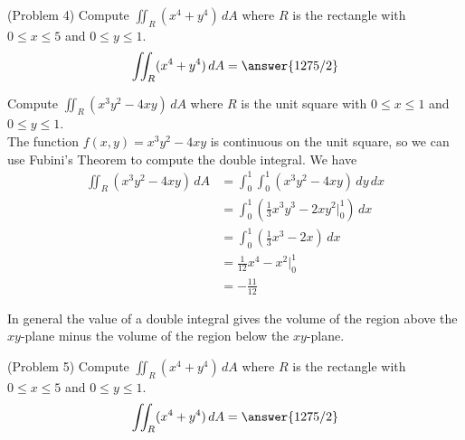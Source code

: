 \documentclass[handout]{ximera}
\begin{document}
\begin{problem}(Problem 4)
Compute $\iint_R (x^4 + y^4) \, dA$ where $R$ is the rectangle with $0 \leq x \leq 5$ and $0 \leq y \leq 1$.\\
\[
\iint_R (x^4 + y^4) \, dA = \answer{1275/2}
\]
\end{problem}

\begin{example}[Example 5]
Compute $\iint_R (x^3y^2 - 4xy) \, dA$ where $R$ is the unit square with $0 \leq x \leq 1$ and $0 \leq y \leq 1$.\\
The function $f(x,y) = x^3y^2 - 4xy$ is continuous on the unit square, so we can use Fubini's Theorem to compute the double integral.
We have
\begin{align*}
\iint_R (x^3y^2 - 4xy) \, dA &= \int_0^1 \int_0^1 (x^3y^2 - 4xy) \, dy\, dx\\
                          &= \int_0^1 \left(\frac13 x^3 y^3  - 2xy^2 \bigg|_0^1 \right) \, dx\\
                          &= \int_0^1 \left(\frac13 x^3 - 2x \right) \, dx\\
                          &= \frac{1}{12} x^4 - x^2 \bigg|_0^1\\
                          &= -\frac{11}{12}
\end{align*}
\end{example}

\begin{remark}
In general the value of a double integral gives the volume of the region above the $xy$-plane minus
the volume of the region below the $xy$-plane.
\end{remark}

\begin{problem}(Problem 5)
Compute $\iint_R (x^4 + y^4) \, dA$ where $R$ is the rectangle with $0 \leq x \leq 5$ and $0 \leq y \leq 1$.\\
\[
\iint_R (x^4 + y^4) \, dA = \answer{1275/2}
\]
\end{problem}
\end{document}
